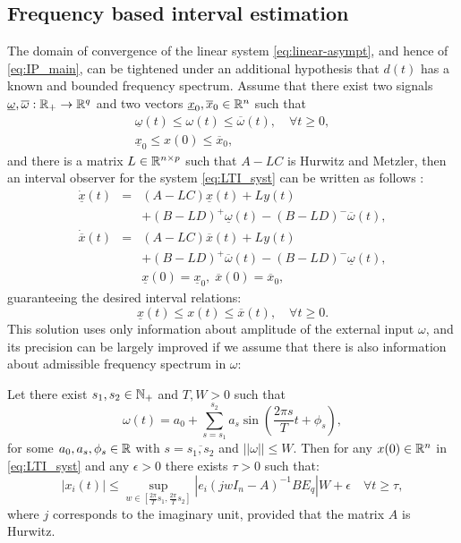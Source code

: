 \subsection{Frequency based interval estimation}
\label{sec:Frequency}
The domain of convergence of the linear system \eqref{eq:linear-asympt}, and hence of \eqref{eq:IP_main}, can be tightened under an additional hypothesis that $d(t)$ has a known and bounded frequency spectrum.
Assume that there exist two signals $\underline{\omega},\overline{\omega}:\mathbb{R}_{+}\to\mathbb{R}^{q}$ and two vectors $\underline{x}_{0},\overline{x}_{0}\in\mathbb{R}^{n}$ such that
\begin{gather*}
\underline{\omega}(t)\leq\omega(t)\leq\overline{\omega}(t),\quad\forall t\geq0,\\
\underline{x}_{0}\leq x(0)\leq\overline{x}_{0},
\end{gather*} and there is a matrix $L\in\mathbb{R}^{n\times p}$ such that $A-LC$ is Hurwitz and Metzler, then an interval observer for the system \eqref{eq:LTI_syst} can be written as follows \cite{REZ11}:
\begin{eqnarray}
\dot{\underline{x}}(t) & = & (A-LC)\underline{x}(t)+Ly(t)\nonumber \\
&  & +(B-LD)^{+}\underline{\omega}(t)-(B-LD)^{-}\overline{\omega}(t),\nonumber \\
\dot{\overline{x}}(t) & = & (A-LC)\overline{x}(t)+Ly(t)\label{eq:IO_LTI}\\
&  & +(B-LD)^{+}\overline{\omega}(t)-(B-LD)^{-}\underline{\omega}(t),\nonumber \\
&  & \underline{x}(0)=\underline{x}_{0},\;\overline{x}(0)=\overline{x}_{0},\nonumber 
\end{eqnarray}
guaranteeing the desired interval relations:
\[
\underline{x}(t)\leq x(t)\leq\overline{x}(t),\quad\forall t\geq0.
\]
This solution uses only information about amplitude of the external input $\omega$, and its precision can be largely improved if we assume that there is also information about admissible frequency spectrum in $\omega$:
\begin{lemma}
	\label{lem:IntFreq} Let there exist $s_{1},s_{2}\in\mathbb{N}_{+}$ and $T,W>0$
	such that
	\[
	\omega(t)=a_{0}+\sum_{s=s_{1}}^{s_{2}}a_{s}\sin\left(\frac{2\pi s}{T}t+\phi_{s}\right),
	\]
	for some $a_{0},a_{s},\phi_{s}\in\mathbb{R}$ with $s=\overline{s_{1},s_{2}}$ and $||\omega||\leq W$. Then for any $x(0)\in\mathbb{R}^{n}$ in \eqref{eq:LTI_syst} and any $\epsilon>0$ there exists $\tau>0$ such that:
	\[
	|x_{i}(t)|\leq\sup_{w\in[\frac{2\pi}{T}s_{1},\frac{2\pi}{T}s_{2}]}|e_{i}(jwI_{n}-A)^{-1}BE_{q}|W+\epsilon\quad\forall t\geq\tau,
	\]
	where $j$ corresponds to the imaginary unit, provided that the matrix $A$ is Hurwitz.
\end{lemma}
